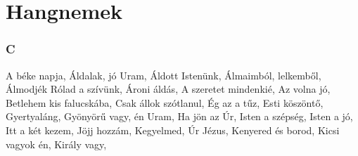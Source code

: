 \section*{Hangnemek}
\begin{multicols}{2}
\begin{minipage}{\textwidth}
\subsubsection*{C}
A béke napja, \pageref{AbC3A9kenapja}\newline
Áldalak, jó Uram, \pageref{C381ldalak2CjC3B3Uram}\newline
Áldott Istenünk, \pageref{C381ldottIstenC3BCnk}\newline
Álmaimból, lelkemből, \pageref{C381lmaimbC3B3l2ClelkembC591l}\newline
Álmodjék Rólad a szívünk, \pageref{C381lmodjC3A9kRC3B3ladaszC3ADvC3BCnk}\newline
Ároni áldás, \pageref{C381roniC3A1ldC3A1s}\newline
A szeretet mindenkié, \pageref{AszeretetmindenkiC3A9}\newline
Az volna jó, \pageref{AzvolnajC3B3}\newline
Betlehem kis falucskába, \pageref{BetlehemkisfalucskC3A1ba}\newline
Csak állok szótlanul, \pageref{CsakC3A1llokszC3B3tlanul}\newline
Ég az a tűz, \pageref{C389gazatC5B1z}\newline
Esti köszöntő, \pageref{EstikC3B6szC3B6ntC591}\newline
Gyertyaláng, \pageref{GyertyalC3A1ng}\newline
Gyönyörű vagy, én Uram, \pageref{GyC3B6nyC3B6rC5B1vagy2CC3A9nUram}\newline
Ha jön az Úr, \pageref{HajC3B6nazC39Ar}\newline
Isten a szépség, Isten a jó, \pageref{IstenaszC3A9psC3A9g2CIstenajC3B3}\newline
Itt a két kezem, \pageref{IttakC3A9tkezem}\newline
Jöjj hozzám, \pageref{JC3B6jjhozzC3A1m}\newline
Kegyelmed, Úr Jézus, \pageref{Kegyelmed2CC39ArJC3A9zus}\newline
Kenyered és borod, \pageref{KenyeredC3A9sborod}\newline
Kicsi vagyok én, \pageref{KicsivagyokC3A9n}\newline
Király vagy, \pageref{KirC3A1lyvagy}\newline

\end{minipage}
\end{multicols}
